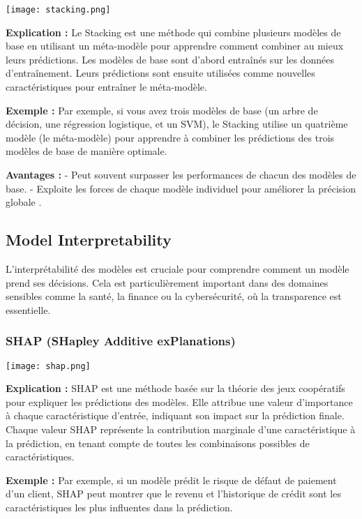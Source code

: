 \documentclass[10pt,a4paper]{article}
\begin{document}
\texttt{[image: stacking.png]}

\textbf{Explication :}
Le Stacking est une méthode qui combine plusieurs modèles de base en utilisant un méta-modèle pour apprendre comment combiner au mieux leurs prédictions. Les modèles de base sont d'abord entraînés sur les données d'entraînement. Leurs prédictions sont ensuite utilisées comme nouvelles caractéristiques pour entraîner le méta-modèle.

\textbf{Exemple :}
Par exemple, si vous avez trois modèles de base (un arbre de décision, une régression logistique, et un SVM), le Stacking utilise un quatrième modèle (le méta-modèle) pour apprendre à combiner les prédictions des trois modèles de base de manière optimale.

\textbf{Avantages :}
- Peut souvent surpasser les performances de chacun des modèles de base.
- Exploite les forces de chaque modèle individuel pour améliorer la précision globale \cite{wikipedia_ensemble}.


\subsection*{Model Interpretability}

L'interprétabilité des modèles est cruciale pour comprendre comment un modèle prend ses décisions. Cela est particulièrement important dans des domaines sensibles comme la santé, la finance ou la cybersécurité, où la transparence est essentielle.

\subsubsection*{SHAP (SHapley Additive exPlanations)}

\texttt{[image: shap.png]}

\textbf{Explication :}
SHAP est une méthode basée sur la théorie des jeux coopératifs pour expliquer les prédictions des modèles. Elle attribue une valeur d'importance à chaque caractéristique d'entrée, indiquant son impact sur la prédiction finale. Chaque valeur SHAP représente la contribution marginale d'une caractéristique à la prédiction, en tenant compte de toutes les combinaisons possibles de caractéristiques.

\textbf{Exemple :}
Par exemple, si un modèle prédit le risque de défaut de paiement d'un client, SHAP peut montrer que le revenu et l'historique de crédit sont les caractéristiques les plus influentes dans la prédiction.
\end{document}

